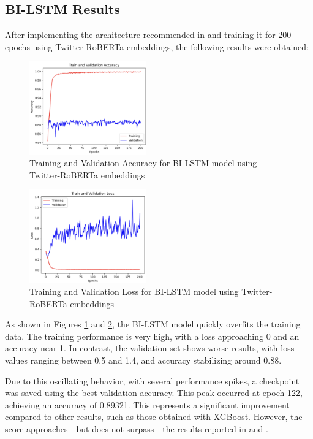 \subsection{BI-LSTM Results}

After implementing the architecture recommended in \cite{fieri2023offensive} and training it for 200 epochs using Twitter-RoBERTa embeddings, the following results were obtained:

\begin{figure}[H]
    \centering
    \includegraphics[width=0.45\textwidth]{images/trainingValidationAccurayBI_LSTM.png}
    \caption{Training and Validation Accuracy for BI-LSTM model using Twitter-RoBERTa embeddings}
    \label{fig:accuracy_bilstm}
\end{figure}

\begin{figure}[H]
    \centering
    \includegraphics[width=0.45\textwidth]{images/trainingValidationLossBI_LSTM.png}
    \caption{Training and Validation Loss for BI-LSTM model using Twitter-RoBERTa embeddings}
    \label{fig:loss_bilstm}
\end{figure}

As shown in Figures \ref{fig:accuracy_bilstm} and \ref{fig:loss_bilstm}, the BI-LSTM model quickly overfits the training data. The training performance is very high, with a loss approaching 0 and an accuracy near 1. In contrast, the validation set shows worse results, with loss values ranging between 0.5 and 1.4, and accuracy stabilizing around 0.88.

Due to this oscillating behavior, with several performance spikes, a checkpoint was saved using the best validation accuracy. This peak occurred at epoch 122, achieving an accuracy of 0.89321. This represents a significant improvement compared to other results, such as those obtained with XGBoost. However, the score approaches—but does not surpass—the results reported in \cite{fieri2023offensive} and \cite{toktarova2023hate}.

